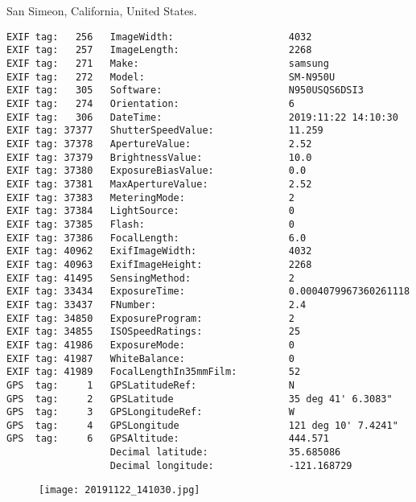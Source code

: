 \section{\protect{}}
\noindent San Simeon, California, United States.
\noindent
\begin{lstlisting}
EXIF tag:   256   ImageWidth:                    4032
EXIF tag:   257   ImageLength:                   2268
EXIF tag:   271   Make:                          samsung
EXIF tag:   272   Model:                         SM-N950U
EXIF tag:   305   Software:                      N950USQS6DSI3
EXIF tag:   274   Orientation:                   6
EXIF tag:   306   DateTime:                      2019:11:22 14:10:30
EXIF tag: 37377   ShutterSpeedValue:             11.259
EXIF tag: 37378   ApertureValue:                 2.52
EXIF tag: 37379   BrightnessValue:               10.0
EXIF tag: 37380   ExposureBiasValue:             0.0
EXIF tag: 37381   MaxApertureValue:              2.52
EXIF tag: 37383   MeteringMode:                  2
EXIF tag: 37384   LightSource:                   0
EXIF tag: 37385   Flash:                         0
EXIF tag: 37386   FocalLength:                   6.0
EXIF tag: 40962   ExifImageWidth:                4032
EXIF tag: 40963   ExifImageHeight:               2268
EXIF tag: 41495   SensingMethod:                 2
EXIF tag: 33434   ExposureTime:                  0.0004079967360261118
EXIF tag: 33437   FNumber:                       2.4
EXIF tag: 34850   ExposureProgram:               2
EXIF tag: 34855   ISOSpeedRatings:               25
EXIF tag: 41986   ExposureMode:                  0
EXIF tag: 41987   WhiteBalance:                  0
EXIF tag: 41989   FocalLengthIn35mmFilm:         52
GPS  tag:     1   GPSLatitudeRef:                N
GPS  tag:     2   GPSLatitude                    35 deg 41' 6.3083"
GPS  tag:     3   GPSLongitudeRef:               W
GPS  tag:     4   GPSLongitude                   121 deg 10' 7.4241"
GPS  tag:     6   GPSAltitude:                   444.571
                  Decimal latitude:              35.685086
                  Decimal longitude:             -121.168729

\end{lstlisting}
\clearpage
\begin{figure}
\raggedleft
\texttt{[image: 20191122\_141030.jpg]}
\end{figure}


\clearpage
